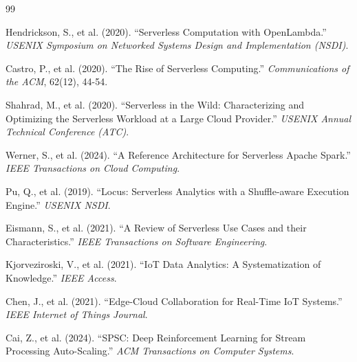 \documentclass[12pt, a4paper]{report}
\begin{document}
\tableofcontents
\clearpage
\listoftables
\clearpage
\listoffigures
\clearpage











\begin{thebibliography}{99}

Hendrickson, S., et al. (2020). ``Serverless Computation with OpenLambda.'' \textit{USENIX Symposium on Networked Systems Design and Implementation (NSDI)}.

Castro, P., et al. (2020). ``The Rise of Serverless Computing.'' \textit{Communications of the ACM}, 62(12), 44-54.

Shahrad, M., et al. (2020). ``Serverless in the Wild: Characterizing and Optimizing the Serverless Workload at a Large Cloud Provider.'' \textit{USENIX Annual Technical Conference (ATC)}.

Werner, S., et al. (2024). ``A Reference Architecture for Serverless Apache Spark.'' \textit{IEEE Transactions on Cloud Computing}.

Pu, Q., et al. (2019). ``Locus: Serverless Analytics with a Shuffle-aware Execution Engine.'' \textit{USENIX NSDI}.

Eismann, S., et al. (2021). ``A Review of Serverless Use Cases and their Characteristics.'' \textit{IEEE Transactions on Software Engineering}.

Kjorveziroski, V., et al. (2021). ``IoT Data Analytics: A Systematization of Knowledge.'' \textit{IEEE Access}.

Chen, J., et al. (2021). ``Edge-Cloud Collaboration for Real-Time IoT Systems.'' \textit{IEEE Internet of Things Journal}.

Cai, Z., et al. (2024). ``SPSC: Deep Reinforcement Learning for Stream Processing Auto-Scaling.'' \textit{ACM Transactions on Computer Systems}.


\end{thebibliography}
\end{document}
